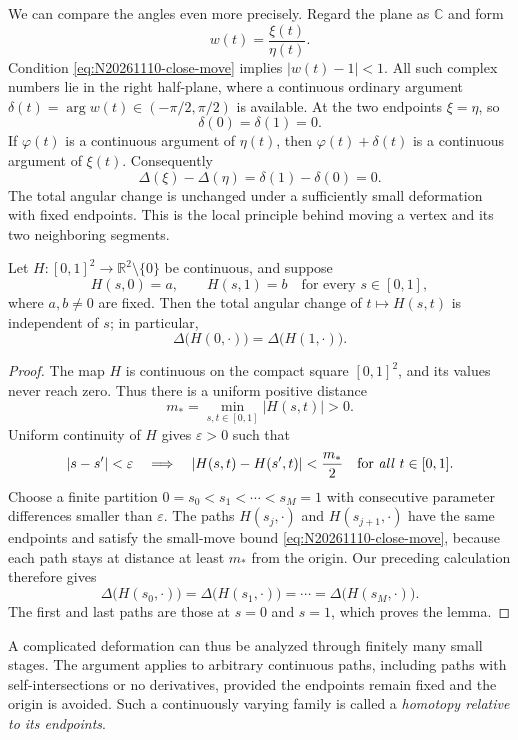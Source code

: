 We can compare the angles even more precisely. Regard the plane as \(\mathbb C\) and form
\[
 w(t)=\frac{\xi(t)}{\eta(t)}.
\]
Condition \eqref{eq:N20261110-close-move} implies \(|w(t)-1|<1\). All such complex numbers lie in the right half-plane, where a continuous ordinary argument \(\delta(t)=\arg w(t)\in(-\pi/2,\pi/2)\) is available. At the two endpoints \(\xi=\eta\), so
\[
 \delta(0)=\delta(1)=0.
\]
If \(\varphi(t)\) is a continuous argument of \(\eta(t)\), then \(\varphi(t)+\delta(t)\) is a continuous argument of \(\xi(t)\). Consequently
\[
 \Delta(\xi)-\Delta(\eta)
 =\delta(1)-\delta(0)=0.
\]
The total angular change is unchanged under a sufficiently small deformation with fixed endpoints. This is the local principle behind moving a vertex and its two neighboring segments.

\begin{lemma}
Let \(H:[0,1]^2\to\mathbb R^2\setminus\{0\}\) be continuous, and suppose
\[
 H(s,0)=a,\qquad H(s,1)=b
 \quad\text{for every }s\in[0,1],
\]
where \(a,b\ne0\) are fixed. Then the total angular change of \(t\mapsto H(s,t)\) is independent of \(s\); in particular,
\[
 \Delta\bigl(H(0,\cdot)\bigr)
 =\Delta\bigl(H(1,\cdot)\bigr).
\]
\end{lemma}
\begin{proof}
The map \(H\) is continuous on the compact square \([0,1]^2\), and its values never reach zero. Thus there is a uniform positive distance
\[
 m_*=\min_{s,t\in[0,1]}|H(s,t)|>0.
\]
Uniform continuity of \(H\) gives \(\varepsilon>0\) such that
\[
 |s-s'|<\varepsilon
 \quad\Longrightarrow\quad
 |H(s,t)-H(s',t)|<\frac{m_*}{2}
 \quad\text{for \emph{all} }t\in[0,1].
\]
Choose a finite partition \(0=s_0<s_1<\cdots<s_M=1\) with consecutive parameter differences smaller than \(\varepsilon\). The paths \(H(s_j,\cdot)\) and \(H(s_{j+1},\cdot)\) have the same endpoints and satisfy the small-move bound \eqref{eq:N20261110-close-move}, because each path stays at distance at least \(m_*\) from the origin. Our preceding calculation therefore gives
\[
 \Delta\bigl(H(s_0,\cdot)\bigr)
 =\Delta\bigl(H(s_1,\cdot)\bigr)
 =\cdots
 =\Delta\bigl(H(s_M,\cdot)\bigr).
\]
The first and last paths are those at \(s=0\) and \(s=1\), which proves the lemma.
\end{proof}

A complicated deformation can thus be analyzed through finitely many small stages. The argument applies to arbitrary continuous paths, including paths with self-intersections or no derivatives, provided the endpoints remain fixed and the origin is avoided. Such a continuously varying family is called a \emph{homotopy relative to its endpoints}.

